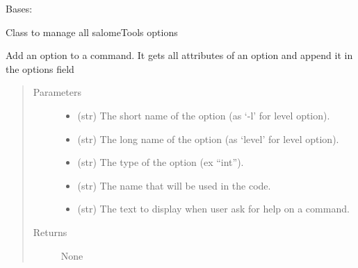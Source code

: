 \documentclass[a4paper,10pt,english]{sphinxmanual}
\begin{document}
\begin{fulllineitems}
\label{\detokenize{commands/apidoc/src:src.options.Options}}
Bases: 

Class to manage all salomeTools options

\begin{fulllineitems}
\label{\detokenize{commands/apidoc/src:src.options.Options.add_option}}
Add an option to a command. It gets all attributes
of an option and append it in the options field
\begin{quote}\begin{description}
\item[{Parameters}] \leavevmode\begin{itemize}
\item {} 
 \textendash{} (str) 
The short name of the option (as ‘-l’ for level option).

\item {} 
 \textendash{} (str) 
The long name of the option (as ‘\textendash{}level’ for level option).

\item {} 
 \textendash{} (str) The type of the option (ex “int”).

\item {} 
 \textendash{} (str) The name that will be used in the code.

\item {} 
 \textendash{} (str) 
The text to display when user ask for help on a command.

\end{itemize}

\item[{Returns}] \leavevmode
None

\end{description}\end{quote}

\end{fulllineitems}


\end{fulllineitems}
\end{document}
